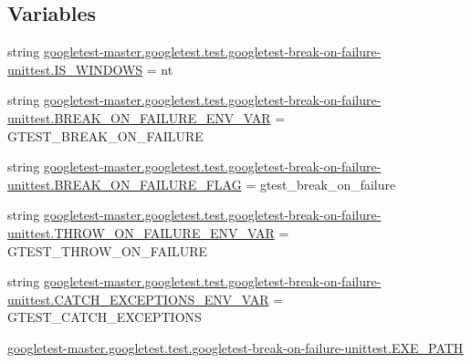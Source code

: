 \subsection*{Variables}
\begin{DoxyCompactItemize}
\item 
string \mbox{\hyperlink{namespacegoogletest-master_1_1googletest_1_1test_1_1googletest-break-on-failure-unittest_accbeb413ba2823f654b05e73e29ef1ed}{googletest-\/master.\+googletest.\+test.\+googletest-\/break-\/on-\/failure-\/unittest.\+I\+S\+\_\+\+W\+I\+N\+D\+O\+WS}} = \textquotesingle{}nt\textquotesingle{}
\item 
string \mbox{\hyperlink{namespacegoogletest-master_1_1googletest_1_1test_1_1googletest-break-on-failure-unittest_a574ba48fbfc3ee899491b4d9658daa31}{googletest-\/master.\+googletest.\+test.\+googletest-\/break-\/on-\/failure-\/unittest.\+B\+R\+E\+A\+K\+\_\+\+O\+N\+\_\+\+F\+A\+I\+L\+U\+R\+E\+\_\+\+E\+N\+V\+\_\+\+V\+AR}} = \textquotesingle{}G\+T\+E\+S\+T\+\_\+\+B\+R\+E\+A\+K\+\_\+\+O\+N\+\_\+\+F\+A\+I\+L\+U\+RE\textquotesingle{}
\item 
string \mbox{\hyperlink{namespacegoogletest-master_1_1googletest_1_1test_1_1googletest-break-on-failure-unittest_a936d9667f29ff13df4ed795644faf9b7}{googletest-\/master.\+googletest.\+test.\+googletest-\/break-\/on-\/failure-\/unittest.\+B\+R\+E\+A\+K\+\_\+\+O\+N\+\_\+\+F\+A\+I\+L\+U\+R\+E\+\_\+\+F\+L\+AG}} = \textquotesingle{}gtest\+\_\+break\+\_\+on\+\_\+failure\textquotesingle{}
\item 
string \mbox{\hyperlink{namespacegoogletest-master_1_1googletest_1_1test_1_1googletest-break-on-failure-unittest_aa893baeafe2c754fd729cb6aaaef70d6}{googletest-\/master.\+googletest.\+test.\+googletest-\/break-\/on-\/failure-\/unittest.\+T\+H\+R\+O\+W\+\_\+\+O\+N\+\_\+\+F\+A\+I\+L\+U\+R\+E\+\_\+\+E\+N\+V\+\_\+\+V\+AR}} = \textquotesingle{}G\+T\+E\+S\+T\+\_\+\+T\+H\+R\+O\+W\+\_\+\+O\+N\+\_\+\+F\+A\+I\+L\+U\+RE\textquotesingle{}
\item 
string \mbox{\hyperlink{namespacegoogletest-master_1_1googletest_1_1test_1_1googletest-break-on-failure-unittest_a82b2bf7e44d9e75f8d82ad9d63648585}{googletest-\/master.\+googletest.\+test.\+googletest-\/break-\/on-\/failure-\/unittest.\+C\+A\+T\+C\+H\+\_\+\+E\+X\+C\+E\+P\+T\+I\+O\+N\+S\+\_\+\+E\+N\+V\+\_\+\+V\+AR}} = \textquotesingle{}G\+T\+E\+S\+T\+\_\+\+C\+A\+T\+C\+H\+\_\+\+E\+X\+C\+E\+P\+T\+I\+O\+NS\textquotesingle{}
\item 
\mbox{\hyperlink{namespacegoogletest-master_1_1googletest_1_1test_1_1googletest-break-on-failure-unittest_a960e6051cdd67ffaa8095d00c033e4bb}{googletest-\/master.\+googletest.\+test.\+googletest-\/break-\/on-\/failure-\/unittest.\+E\+X\+E\+\_\+\+P\+A\+TH}}

\end{DoxyCompactItemize}
